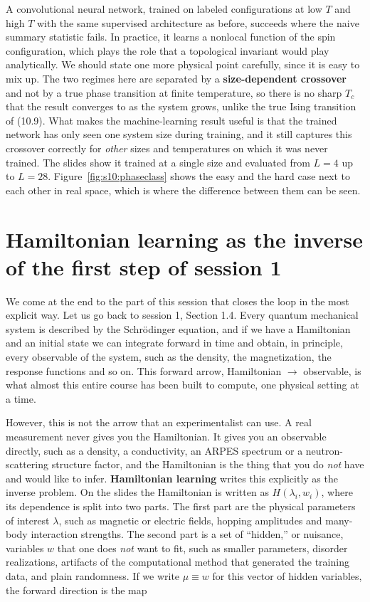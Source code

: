A convolutional neural network, trained on labeled configurations at low $T$ and high $T$ with the
same supervised architecture as before, succeeds where the naive summary statistic fails. In
practice, it learns a nonlocal function of the spin configuration, which plays the role that a
topological invariant would play analytically. We should state one more physical point carefully,
since it is easy to mix up. The two regimes here are separated by a \textbf{size-dependent
crossover} and not by a true phase transition at finite temperature, so there is no sharp $T_c$
that the result converges to as the system grows, unlike the true Ising transition of (10.9). What
makes the machine-learning result useful is that the trained network has only seen one system size
during training, and it still captures this crossover correctly for \emph{other} sizes and
temperatures on which it was never trained. The slides show it trained at a single size and
evaluated from $L = 4$ up to $L = 28$. Figure~\ref{fig:s10:phaseclass} shows the easy and the hard
case next to each other in real space, which is where the difference between them can be seen.



\section{Hamiltonian learning as the inverse of the first step of session 1}

We come at the end to the part of this session that closes the loop in the most explicit way. Let
us go back to session 1, Section 1.4. Every quantum mechanical system is described by the
Schr\"odinger equation, and if we have a Hamiltonian and an initial state we can integrate forward
in time and obtain, in principle, every observable of the system, such as the density, the
magnetization, the response functions and so on. This forward arrow, Hamiltonian $\to$ observable,
is what almost this entire course has been built to compute, one physical setting at a time.

However, this is not the arrow that an experimentalist can use. A real measurement never gives you
the Hamiltonian. It gives you an observable directly, such as a density, a conductivity, an ARPES
spectrum or a neutron-scattering structure factor, and the Hamiltonian is the thing that you do
\emph{not} have and would like to infer. \textbf{Hamiltonian learning} writes this explicitly as the
inverse problem. On the slides the Hamiltonian is written as $H(\lambda_i, w_i)$, where its
dependence is split into two parts. The first part are the physical parameters of interest
$\lambda$, such as magnetic or electric fields, hopping amplitudes and many-body interaction
strengths. The second part is a set of ``hidden,'' or nuisance, variables $w$ that one does
\emph{not} want to fit, such as smaller parameters, disorder realizations, artifacts of the
computational method that generated the training data, and plain randomness. If we write $\mu
\equiv w$ for this vector of hidden variables, the forward direction is the map

